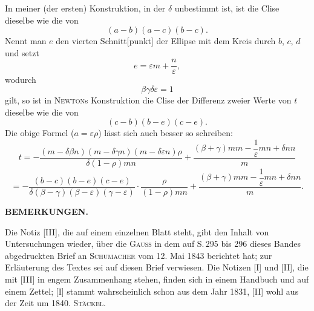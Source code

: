 In meiner (der ersten) Konstruktion, in der $\delta$ unbestimmt ist, ist die Clise dieselbe wie die von
\[
(a-b)(a-c)(b-c).
\]
Nennt man $e$ den vierten Schnitt[punkt] der Ellipse mit dem Kreis durch $b$, $c$, $d$ und setzt
\[
e = \varepsilon m + \frac{n}{\varepsilon},
\]
wodurch
\[
\beta\gamma\delta\varepsilon = 1
\]
gilt, so ist in \textsc{Newton}s Konstruktion die Clise der Differenz zweier Werte von $t$ dieselbe wie die von
\[
(c-b)(b-e)(c-e).
\]
Die obige Formel ($a=\varepsilon\rho$) lässt sich auch besser so schreiben:
\[
t = -\frac{(m-\delta\beta n)(m-\delta\gamma n)(m-\delta\varepsilon n)\rho}{\delta(1-\rho)mn} + \frac{(\beta+\gamma)mm-\dfrac{1}{\varepsilon}mn+\delta nn}{m}
\]
\[
= -\frac{(b-c)(b-e)(c-e)}{\delta(\beta-\gamma)(\beta-\varepsilon)(\gamma-\varepsilon)}\cdot\frac{\rho}{(1-\rho)mn} + \frac{(\beta+\gamma)mm-\dfrac{1}{\varepsilon}mn+\delta nn}{m}.
\]

\begin{center}\textbf{BEMERKUNGEN.}\end{center}

Die Notiz [III], die auf einem einzelnen Blatt steht, gibt den Inhalt von Untersuchungen wieder, über die \textsc{Gauss} in dem auf S.\,295 bis 296 dieses Bandes abgedruckten Brief an \textsc{Schumacher} vom 12. Mai 1843 berichtet hat; zur Erläuterung des Textes sei auf diesen Brief verwiesen. Die Notizen [I] und [II], die mit [III] in engem Zusammenhang stehen, finden sich in einem Handbuch und auf einem Zettel; [I] stammt wahrscheinlich schon aus dem Jahr 1831, [II] wohl aus der Zeit um 1840.
\hfill \textsc{Stäckel}.
